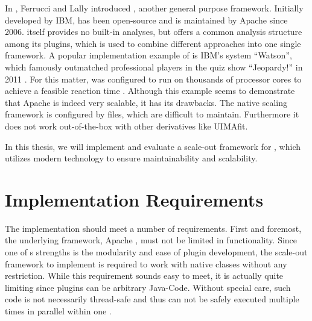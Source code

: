 In \cite{ferrucci2004uima}, Ferrucci and Lally introduced \uima{}, another general purpose \nlp{} framework. Initially developed by IBM, \uima{} has been open-source and is maintained by Apache since 2006. \uima{} itself provides no built-in \nlp{} analyses, but offers a common analysis structure among its plugins, which is used to combine different \nlp{} approaches into one single framework. A popular implementation example of \uima{} is IBM's \qa{} system ``Watson'', which famously outmatched professional players in the quiz show ``Jeopardy!'' in 2011 \cite{ferrucci2012introduction,epstein2012making}. For this matter, \uima{} was configured to run on thousands of processor cores to achieve a feasible reaction time \cite{epstein2012making}. Although this example seems to demonstrate that Apache \uima{} is indeed very scalable, it has its drawbacks. The native \uima{} scaling framework \uimaas{} is configured by \xml{} files, which are difficult to maintain. Furthermore it does not work out-of-the-box with other \uima{} derivatives like UIMAfit. 

In this thesis, we will implement and evaluate a scale-out framework for \uima{}, which utilizes modern technology to ensure maintainability and scalability.

\section{Implementation Requirements}
\label{sec:requirements}
The implementation should meet a number of requirements. First and foremost, the underlying framework, Apache \uima{}, must not be limited in functionality. Since one of \uima{}s strengths is the modularity and ease of plugin development, the scale-out framework to implement is required to work with native \uima{} classes without any restriction. While this requirement sounds easy to meet, it is actually quite limiting since \uima{} plugins can be arbitrary Java-Code. Without special care, such code is not necessarily thread-safe and thus can not be safely executed multiple times in parallel within one \jvm{}.

